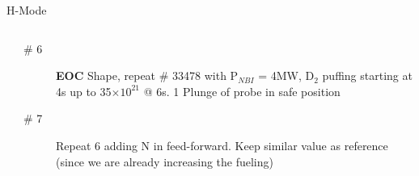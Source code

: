 \documentclass[10pt, compress]{beamer}
\newcommand\Fontvi{\fontsize{8}{7.2}\selectfont}
\begin{document}
\begin{frame}{H-Mode}
\Fontvi
  \vspace{-1cm}
\begin{columns}
  \begin{column}{0.5\textwidth}
  \end{column}
  \begin{column}{0.5\textwidth}
    \begin{description}
      \item[\# 6] \textbf{EOC} Shape, repeat \# 33478 with P$_{NBI}$ =
        4MW, D$_2$ puffing starting at 4s up to 35$\times 10^{21}$ @
        6s. 1 Plunge of probe in safe position
      \item[\# 7] Repeat 6 adding N in feed-forward. Keep similar
        value as reference (since we are already increasing the fueling)
    \end{description}
  \end{column}
\end{columns}
\end{frame}
\end{document}
